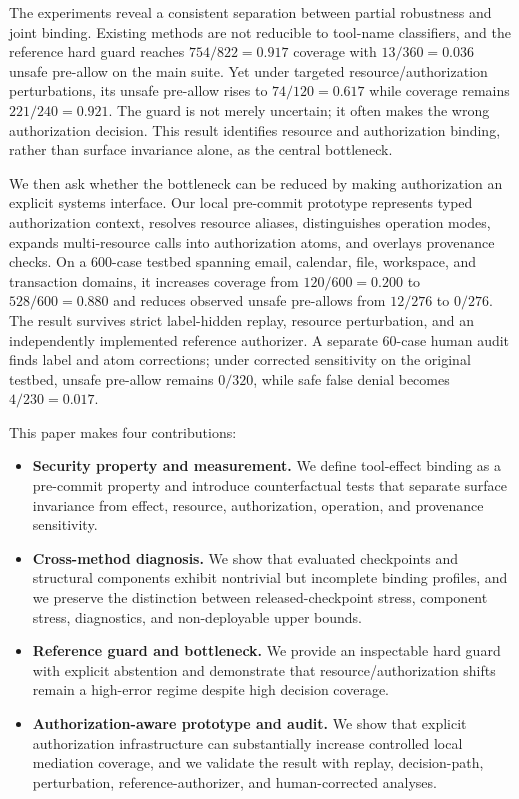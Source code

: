 \documentclass[10pt,twocolumn]{article}
\begin{document}
The experiments reveal a consistent separation between partial robustness and joint binding. Existing methods are not reducible to tool-name classifiers, and the reference hard guard reaches $754/822=0.917$ coverage with $13/360=0.036$ unsafe pre-allow on the main suite. Yet under targeted resource/authorization perturbations, its unsafe pre-allow rises to $74/120=0.617$ while coverage remains $221/240=0.921$. The guard is not merely uncertain; it often makes the wrong authorization decision. This result identifies resource and authorization binding, rather than surface invariance alone, as the central bottleneck.

We then ask whether the bottleneck can be reduced by making authorization an explicit systems interface. Our local pre-commit prototype represents typed authorization context, resolves resource aliases, distinguishes operation modes, expands multi-resource calls into authorization atoms, and overlays provenance checks. On a 600-case testbed spanning email, calendar, file, workspace, and transaction domains, it increases coverage from $120/600=0.200$ to $528/600=0.880$ and reduces observed unsafe pre-allows from $12/276$ to $0/276$. The result survives strict label-hidden replay, resource perturbation, and an independently implemented reference authorizer. A separate 60-case human audit finds label and atom corrections; under corrected sensitivity on the original testbed, unsafe pre-allow remains $0/320$, while safe false denial becomes $4/230=0.017$.

This paper makes four contributions:

\begin{itemize}
  \item \textbf{Security property and measurement.} We define tool-effect binding as a pre-commit property and introduce counterfactual tests that separate surface invariance from effect, resource, authorization, operation, and provenance sensitivity.
  \item \textbf{Cross-method diagnosis.} We show that evaluated checkpoints and structural components exhibit nontrivial but incomplete binding profiles, and we preserve the distinction between released-checkpoint stress, component stress, diagnostics, and non-deployable upper bounds.
  \item \textbf{Reference guard and bottleneck.} We provide an inspectable hard guard with explicit abstention and demonstrate that resource/authorization shifts remain a high-error regime despite high decision coverage.
  \item \textbf{Authorization-aware prototype and audit.} We show that explicit authorization infrastructure can substantially increase controlled local mediation coverage, and we validate the result with replay, decision-path, perturbation, reference-authorizer, and human-corrected analyses.
\end{itemize}
\end{document}
